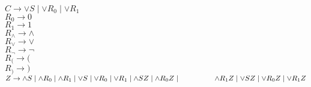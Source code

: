 \documentclass[11pt]{article}
\begin{document}
\begin{enumerate}
\begin{itemize}
\\\hspace*{6mm} $C \rightarrow \vee S \mid \vee R_{0} \mid \vee R_{1}$
\\\hspace*{6mm} $R_{0} \rightarrow 0$
\\\hspace*{6mm} $R_{1} \rightarrow 1$
\\\hspace*{6mm} $R_{\wedge} \rightarrow \wedge$
\\\hspace*{6mm} $R_{\vee} \rightarrow \vee$
\\\hspace*{6mm} $R_{\neg} \rightarrow \neg$
\\\hspace*{6mm} $R_{(} \rightarrow ($
\\\hspace*{6mm} $R_{)} \rightarrow )$
\\\hspace*{6mm} $Z \rightarrow \wedge S \mid \wedge R_{0} \mid \wedge R_{1} \mid \vee S \mid \vee R_{0} \mid \vee R_{1} \mid \wedge SZ \mid \wedge R_{0}Z \mid \hspace*{16,5mm} \wedge R_{1}Z \mid \vee SZ \mid \vee R_{0}Z \mid \vee R_{1}Z$

\end{itemize} 
\end{enumerate}
\end{document}
